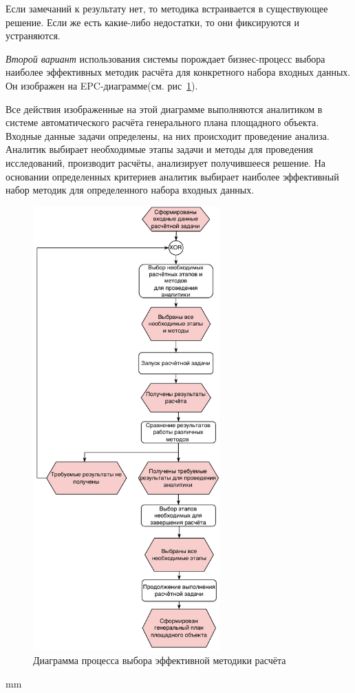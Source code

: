 Если замечаний к результату нет, то методика встраивается в существующее решение.
Если же есть какие-либо недостатки, то они фиксируются и устраняются.


\textit{Второй вариант} использования системы порождает бизнес-процесс
выбора наиболее эффективных методик расчёта для конкретного набора входных данных.
Он изображен на EPC-диаграмме(см. рис\ \ref{pic:analysis__usecases-analytics-epc}).

Все действия изображенные на этой диаграмме выполняются аналитиком в системе автоматического
расчёта генерального плана площадного объекта.
Входные данные задачи определены, на них происходит проведение анализа.
Аналитик выбирает необходимые этапы задачи и методы для проведения исследований, производит расчёты,
анализирует получившееся решение. На основании определенных критериев аналитик выбирает наиболее
эффективный набор методик для определенного набора входных данных.

\begin{figure}[H]
	\hspace*{-4.5 cm}
	\includegraphics[width=0.64\textwidth, left]{analysis/pictures/usecases/analytics_epc}
	\caption{Диаграмма процесса выбора эффективной методики расчёта}
	\label{pic:analysis__usecases-analytics-epc}
\end{figure}
 mm
